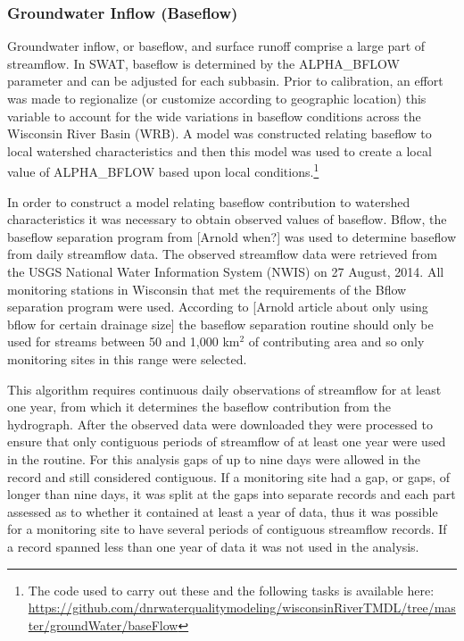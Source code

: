 \subsubsection{Groundwater Inflow (Baseflow)}
	Groundwater inflow, or baseflow, and surface runoff comprise a large part of streamflow. In SWAT, baseflow is determined by the ALPHA\_BFLOW parameter and can be adjusted for each subbasin. Prior to calibration, an effort was made to regionalize (or customize according to geographic location) this variable to account for the wide variations in baseflow conditions across the Wisconsin River Basin (WRB). A model was constructed relating baseflow to local watershed characteristics and then this model was used to create a local value of ALPHA\_BFLOW based upon local conditions.\footnote{The code used to carry out these and the following tasks is available here: \url{https://github.com/dnrwaterqualitymodeling/wisconsinRiverTMDL/tree/master/groundWater/baseFlow}}
	
	In order to construct a model relating baseflow contribution to watershed characteristics it was necessary to obtain observed values of baseflow. Bflow, the baseflow separation program from [Arnold when?] was used to determine baseflow from daily streamflow data. The observed streamflow data were retrieved from the USGS National Water Information System (NWIS) on 27 August, 2014. All monitoring stations in Wisconsin that met the requirements of the Bflow separation program were used.  According to [Arnold article about only using bflow for certain drainage size] the baseflow separation routine should only be used for streams between 50 and 1,000 km$^2$ of contributing area and so only monitoring sites in this range were selected.
	
	This algorithm requires continuous daily observations of streamflow for at least one year, from which it determines the baseflow contribution from the hydrograph.	After the observed data were downloaded they were processed to ensure that only contiguous periods of streamflow of at least one year were used in the routine. For this analysis gaps of up to nine days were allowed in the record and still considered contiguous. If a monitoring site had a gap, or gaps, of longer than nine days, it was split at the gaps into separate records and each part assessed as to whether it contained at least a year of data, thus it was possible for a monitoring site to have several periods of contiguous streamflow records. If a record spanned less than one year of data it was not used in the analysis.
	
